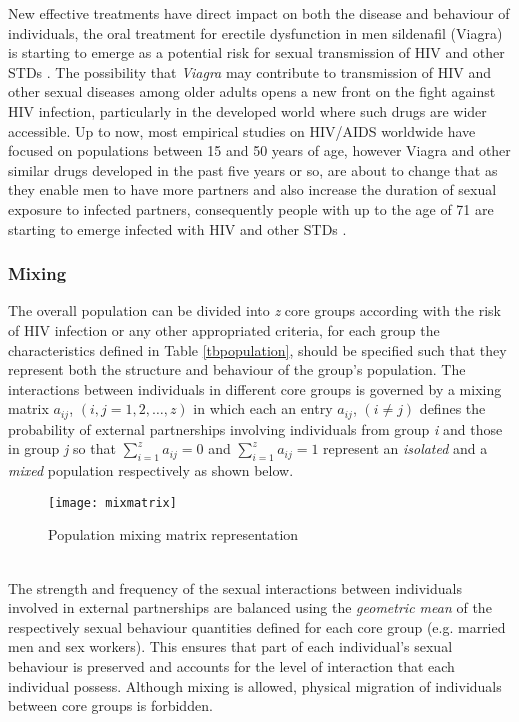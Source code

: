New effective treatments have direct impact on both the disease and behaviour of
individuals, the oral treatment for erectile dysfunction in men sildenafil (Viagra) is
starting to emerge as a potential risk for sexual transmission of HIV and other STDs
\cite{Sherr2000,Kim2002}. The possibility that \emph{Viagra} may contribute to
transmission of HIV and other sexual diseases among older adults opens a new front on the
fight against HIV infection, particularly in the developed world where such drugs are
wider accessible. Up to now, most empirical studies on HIV/AIDS worldwide have focused on
populations between 15 and 50 years of age, however Viagra and other similar drugs
developed in the past five years or so, are about to change that as they enable men to
have more partners and also increase the duration of sexual exposure to infected
partners, consequently people with up to the age of 71 are starting to emerge infected
with HIV and other STDs \cite{Kim2002}.

\subsubsection{Mixing}

The overall population can be divided into \emph{z} core groups according with the risk
of HIV infection or any other appropriated criteria, for each group the characteristics
defined in Table \ref{tbpopulation}, should be specified such that they represent both
the structure and behaviour of the group's population. The interactions between
individuals in different core groups is governed by a mixing matrix $a_{ij}$, $(i,j =
1,2,\ldots, z)$ in which each an entry $a_{ij}$, $(i \neq j)$ defines the probability of
external partnerships involving individuals from group \emph{i} and those in group
\emph{j} so that $\sum \limits_{i=1}^{z} a_{ij} = 0$ and $\sum \limits_{i=1}^{z} a_{ij} =
1$ represent an \emph{isolated} and a \emph{mixed} population respectively as shown
below.
\begin{figure}[h]
\begin{center}
\texttt{[image: mixmatrix]}
\caption{Population mixing matrix representation} \label{mixmatrix}
\end{center}
\end{figure}\\

The strength and frequency of the sexual interactions between individuals involved in
external partnerships are balanced using the \emph{geometric mean} of the respectively
sexual behaviour quantities defined for each core group (e.g. married men and sex
workers). This ensures that part of each individual's sexual behaviour is preserved and
accounts for the level of interaction that each individual possess. Although mixing is
allowed, physical migration of individuals between core groups is forbidden.

